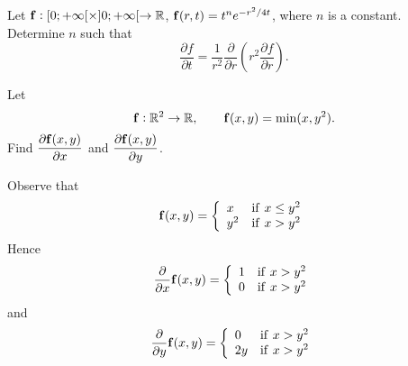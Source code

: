 \section*{}
\begin{multicols}{2}\columnseprule 1pt \columnsep 25pt
\begin{problem}
Let $\mathbf{ f}:[0;+\infty[\times ]0;+\infty[\to \mathbb{R}$, $\mathbf{ f}(r,t) =
t^ne^{-r^2/4t}$, where $n$ is a constant. Determine $n$ such that
$$\dfrac{\partial f}{\partial t} = \dfrac{1}{r^2}\dfrac{\partial }{\partial r} \left(r^2\dfrac{\partial f}{\partial r} \right). $$
\end{problem}
\begin{problem}
Let
$$\mathbf{ f}:\mathbb{R}^2 \to \mathbb{R}, \qquad \mathbf{ f}(x,y) = \min (x, y^2).  $$Find $\dfrac{\partial \mathbf{ f}(x,y)}{\partial x}$ and $\dfrac{\partial \mathbf{ f}(x,y)}{\partial y}$.
\begin{answer}
Observe that
$$\mathbf{ f}(x,y)=\left\{\begin{array}{ll} x & \mathrm{if}\ x \leq y^2 \\   y^2 & \mathrm{if}\ x > y^2 \\ \end{array}\right. $$
Hence
$$\dfrac{\partial}{\partial x}\mathbf{ f}(x,y)=\left\{\begin{array}{ll} 1 & \mathrm{if}\ x > y^2 \\   0 & \mathrm{if}\ x > y^2 \\ \end{array}  \right. $$ and
$$\dfrac{\partial}{\partial y}\mathbf{ f}(x,y)=\left\{\begin{array}{ll} 0 & \mathrm{if}\ x > y^2 \\   2y & \mathrm{if}\ x > y^2 \\ \end{array}\right. $$
\end{answer}
\end{problem}


\end{multicols}
